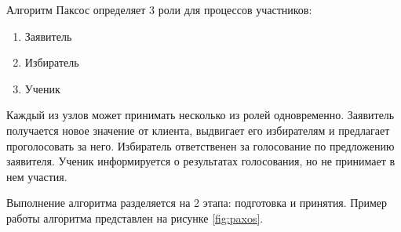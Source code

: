                 Алгоритм Паксос определяет 3 роли для процессов участников:
                
                \begin{enumerate}
                    \item Заявитель
                    \item Избиратель
                    \item Ученик
                \end{enumerate}
                
                Каждый из узлов может принимать несколько из ролей одновременно. Заявитель получается новое значение от клиента, выдвигает его избирателям и предлагает проголосовать за него. Избиратель ответственен за голосование по предложению заявителя. Ученик информируется о результатах голосования, но не принимает в нем участия.
                
                Выполнение алгоритма разделяется на 2 этапа: подготовка и принятия. Пример работы алгоритма представлен на рисунке \ref{fig:paxos}.
                
